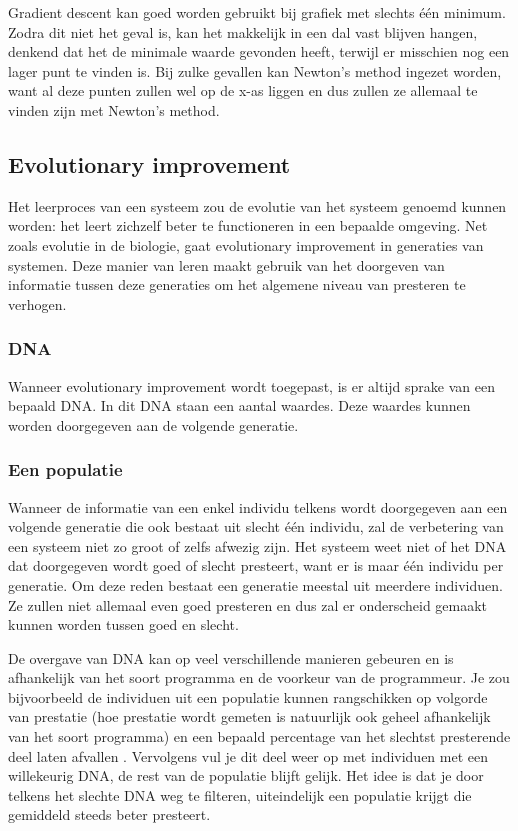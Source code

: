 Gradient descent kan goed worden gebruikt bij grafiek met slechts \'e\'en minimum. Zodra dit niet het geval is, kan het makkelijk in een dal vast blijven hangen, denkend dat het de minimale waarde gevonden heeft, terwijl er misschien nog een lager punt te vinden is. Bij zulke gevallen kan Newton's method ingezet worden, want al deze punten zullen wel op de x-as liggen en dus zullen ze allemaal te vinden zijn met Newton's method.

\subsection{Evolutionary improvement}
Het leerproces van een systeem zou de evolutie van het systeem genoemd kunnen worden: het leert zichzelf beter te functioneren in een bepaalde omgeving. Net zoals evolutie in de biologie, gaat evolutionary improvement in generaties van systemen. Deze manier van leren maakt gebruik van het doorgeven van informatie tussen deze generaties om het algemene niveau van presteren te verhogen.

\subsubsection{DNA}
Wanneer evolutionary improvement wordt toegepast, is er altijd sprake van een bepaald DNA. In dit DNA staan een aantal waardes. Deze waardes kunnen worden doorgegeven aan de volgende generatie.

\subsubsection{Een populatie}
Wanneer de informatie van een enkel individu telkens wordt doorgegeven aan een volgende generatie die ook bestaat uit slecht \'{e}\'{e}n individu, zal de verbetering van een systeem niet zo groot of zelfs afwezig zijn. Het systeem weet niet of het DNA dat doorgegeven wordt goed of slecht presteert, want er is maar \'{e}\'{e}n individu per generatie. Om deze reden bestaat een generatie meestal uit meerdere individuen. Ze zullen niet allemaal even goed presteren en dus zal er onderscheid gemaakt kunnen worden tussen goed en slecht.

De overgave van DNA kan op veel verschillende manieren gebeuren en is afhankelijk van het soort programma en de voorkeur van de programmeur. Je zou bijvoorbeeld de individuen uit een populatie kunnen rangschikken op volgorde van prestatie (hoe prestatie wordt gemeten is natuurlijk ook geheel afhankelijk van het soort programma) en een bepaald percentage van het slechtst presterende deel laten afvallen \cite{carrykh}. Vervolgens vul je dit deel weer op met individuen met een willekeurig DNA, de rest van de populatie blijft gelijk. Het idee is dat je door telkens het slechte DNA weg te filteren, uiteindelijk een populatie krijgt die gemiddeld steeds beter presteert.

